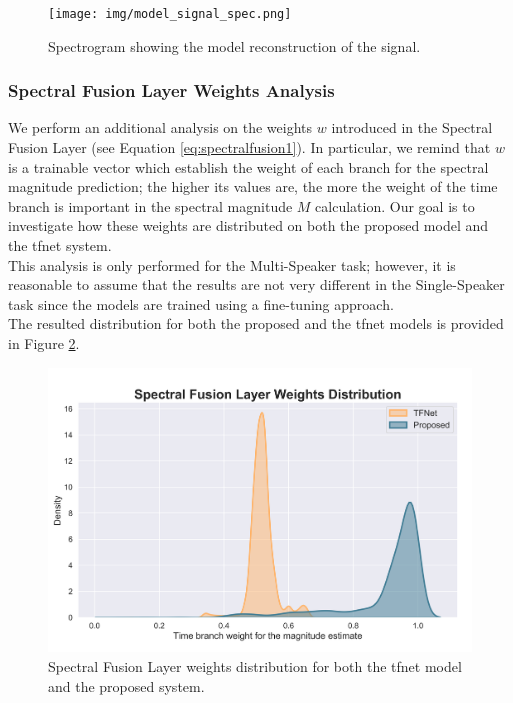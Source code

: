 \begin{figure}[!htb]
	\begin{center}
		\texttt{[image: img/model\_signal\_spec.png]}
		\caption{Spectrogram showing the model reconstruction of the signal.}
		\label{fig:model_signal_spec}
	\end{center}
\end{figure}

\subsubsection{Spectral Fusion Layer Weights Analysis}
We perform an additional analysis on the weights $w$ introduced in the Spectral Fusion Layer (see Equation \ref{eq:spectralfusion1}). In particular, we remind that $w$ is a trainable vector which establish the weight of each branch for the spectral magnitude prediction; the higher its values are, the more the weight of the time branch is important in the spectral magnitude $M$ calculation. Our goal is to investigate how these weights are distributed on both the proposed model and the \gls{tfnet} system.\\
This analysis is only performed for the Multi-Speaker task; however, it is reasonable to assume that the results are not very different in the Single-Speaker task since the models are trained using a fine-tuning approach. \\
The resulted distribution for both the proposed and the \gls{tfnet} models is provided in Figure \ref{fig:weights_results}. \\
\begin{figure}[H]
	\begin{center}
		\includegraphics[scale=0.62]{img/weights_results.png}
		\caption{Spectral Fusion Layer weights distribution for both the \gls{tfnet} model and the proposed system.}
		\label{fig:weights_results}
	\end{center}
\end{figure}
